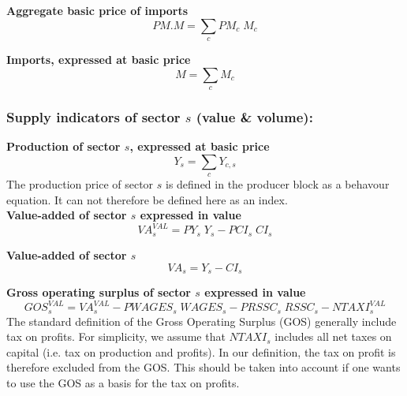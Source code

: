 \documentclass[12pt]{article}
\numberwithin{equation}{section}
\begin{document}
\noindent\textbf{Aggregate basic price of imports} \\
\begin{dmath}
PM . M = \sum_{c} PM_{c} \; M_{c}
\end{dmath}

\noindent\textbf{Imports, expressed at basic price} \\
\begin{dmath}
M = \sum_{c} M_{c}
\end{dmath}




\subsubsection{Supply indicators of sector $s$ (value \& volume):}



\noindent\textbf{Production of sector $s$, expressed at basic price} \\
\begin{dmath}
Y_{s} = \sum_{c} Y_{c, s}
\end{dmath}
The production price of sector $s$ is defined in the producer block as a behavour equation. It can not therefore be defined here as an index. \\

\noindent\textbf{Value-added of sector $s$ expressed in value} \\
\begin{dmath}
VA^{VAL}_{s} = PY_{s} \; Y_{s} - PCI_{s} \; CI_{s}
\end{dmath}

\noindent\textbf{Value-added of sector $s$} \\
\begin{dmath}
VA_{s} = Y_{s} - CI_{s}
\end{dmath}

\noindent\textbf{Gross operating surplus of sector $s$ expressed in value} \\
\begin{dmath}
GOS^{VAL}_{s} = VA^{VAL}_{s} - PWAGES_{s} \; WAGES_{s} - PRSSC_{s} \; RSSC_{s} - NTAXI^{VAL}_{s}
\end{dmath}
The standard definition of the Gross Operating Surplus (GOS) generally include tax on profits. For simplicity, we assume that $NTAXI_{s}$ includes all net taxes on capital (i.e. tax on production and profits). In our definition, the tax on profit is therefore excluded from the GOS. This should be taken into account if one wants to use the GOS as a basis for the tax on profits. \\
\end{document}
